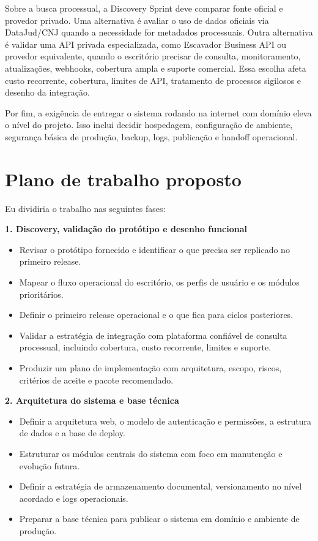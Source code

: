 \documentclass[11pt,a4paper]{article}
\begin{document}
Sobre a busca processual, a Discovery Sprint deve comparar fonte oficial e provedor privado. Uma alternativa é avaliar o uso de dados oficiais via DataJud/CNJ quando a necessidade for metadados processuais. Outra alternativa é validar uma API privada especializada, como Escavador Business API ou provedor equivalente, quando o escritório precisar de consulta, monitoramento, atualizações, webhooks, cobertura ampla e suporte comercial. Essa escolha afeta custo recorrente, cobertura, limites de API, tratamento de processos sigilosos e desenho da integração.\par

Por fim, a exigência de entregar o sistema rodando na internet com domínio eleva o nível do projeto. Isso inclui decidir hospedagem, configuração de ambiente, segurança básica de produção, backup, logs, publicação e handoff operacional.\par

\section*{Plano de trabalho proposto}

Eu dividiria o trabalho nas seguintes fases:\par

\textbf{1. Discovery, validação do protótipo e desenho funcional}\par

\begin{itemize}
\item Revisar o protótipo fornecido e identificar o que precisa ser replicado no primeiro release.
\item Mapear o fluxo operacional do escritório, os perfis de usuário e os módulos prioritários.
\item Definir o primeiro release operacional e o que fica para ciclos posteriores.
\item Validar a estratégia de integração com plataforma confiável de consulta processual, incluindo cobertura, custo recorrente, limites e suporte.
\item Produzir um plano de implementação com arquitetura, escopo, riscos, critérios de aceite e pacote recomendado.
\end{itemize}

\textbf{2. Arquitetura do sistema e base técnica}\par

\begin{itemize}
\item Definir a arquitetura web, o modelo de autenticação e permissões, a estrutura de dados e a base de deploy.
\item Estruturar os módulos centrais do sistema com foco em manutenção e evolução futura.
\item Definir a estratégia de armazenamento documental, versionamento no nível acordado e logs operacionais.
\item Preparar a base técnica para publicar o sistema em domínio e ambiente de produção.
\end{itemize}
\end{document}
